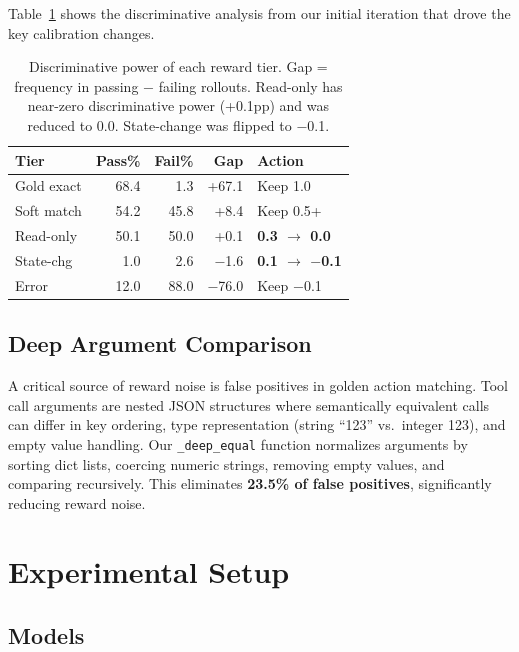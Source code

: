 \documentclass[11pt]{article}
\begin{document}
Table~\ref{tab:discriminative} shows the discriminative analysis from our initial iteration that drove the key calibration changes.

\begin{table}[t]
\centering
\small
\begin{tabular}{lrrrl}
\toprule
\textbf{Tier} & \textbf{Pass\%} & \textbf{Fail\%} & \textbf{Gap} & \textbf{Action} \\
\midrule
Gold exact & 68.4 & 1.3 & +67.1 & Keep 1.0 \\
Soft match & 54.2 & 45.8 & +8.4 & Keep 0.5+ \\
Read-only & 50.1 & 50.0 & +0.1 & \textbf{0.3 $\to$ 0.0} \\
State-chg & 1.0 & 2.6 & $-$1.6 & \textbf{0.1 $\to$ $-$0.1} \\
Error & 12.0 & 88.0 & $-$76.0 & Keep $-$0.1 \\
\bottomrule
\end{tabular}
\caption{Discriminative power of each reward tier. Gap = frequency in passing $-$ failing rollouts. Read-only has near-zero discriminative power (+0.1pp) and was reduced to 0.0. State-change was flipped to $-$0.1.}
\label{tab:discriminative}
\end{table}

\subsection{Deep Argument Comparison}
\label{sec:deepequal}

A critical source of reward noise is false positives in golden action matching. Tool call arguments are nested JSON structures where semantically equivalent calls can differ in key ordering, type representation (string ``123'' vs.\ integer 123), and empty value handling. Our \texttt{\_deep\_equal} function normalizes arguments by sorting dict lists, coercing numeric strings, removing empty values, and comparing recursively. This eliminates \textbf{23.5\% of false positives}, significantly reducing reward noise.

\section{Experimental Setup}
\label{sec:setup}

\subsection{Models}
\end{document}
